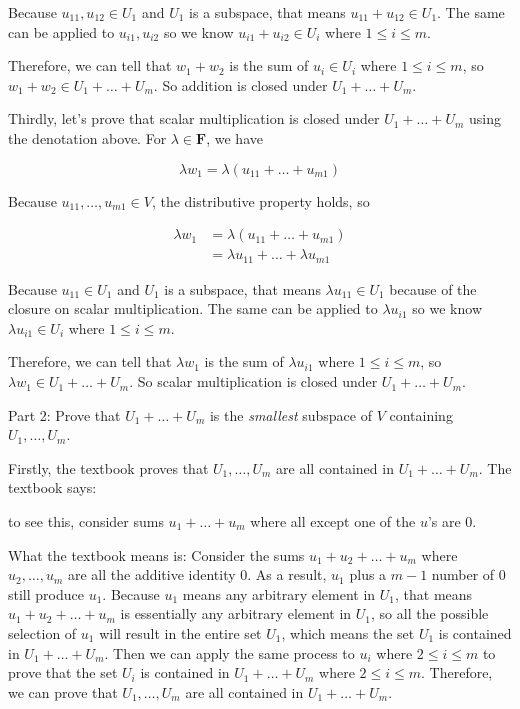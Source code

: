 \documentclass[12pt, letterpaper, oneside]{book}
\begin{document}
Because $u_{11}, u_{12} \in U_1$ and $U_1$ is a subspace, that means $u_{11} +
u_{12} \in U_1$. The same can be applied to $u_{i1}, u_{i2}$ so we know
$u_{i1} + u_{i2} \in U_i$ where $1 \leq i \leq m$.

Therefore, we can tell that $w_1 + w_2$ is the sum of $u_i \in U_i$ where
$1 \leq i \leq m$, so $w_1 + w_2 \in U_1 + \ldots + U_m$. So addition is closed
under $U_1 + \ldots + U_m$.

Thirdly, let's prove that scalar multiplication is closed under $U_1 + \ldots +
U_m$ using the denotation above. For $\lambda \in \mathbf{F}$, we have

\[
  \lambda w_1 = \lambda (u_{11} + \ldots + u_{m1})
\]

Because $u_{11}, \ldots, u_{m1} \in V$, the distributive property holds, so

\begin{align*}
  \lambda w_1 & = \lambda (u_{11} + \ldots + u_{m1}) \\
              & = \lambda u_{11} + \ldots + \lambda u_{m1}
\end{align*}

Because $u_{11} \in U_1$ and $U_1$ is a subspace, that means $\lambda u_{11}
\in U_1$ because of the closure on scalar multiplication. The same can be
applied to $\lambda u_{i1}$ so we know $\lambda u_{i1} \in U_i$ where $1 \leq i
\leq m$.

Therefore, we can tell that $\lambda w_1$ is the sum of $\lambda u_{i1}$ where
$1 \leq i \leq m$, so $\lambda w_1 \in U_1 + \ldots + U_m$. So scalar
multiplication is closed under $U_1 + \ldots + U_m$.

Part 2: Prove that $U_1 + \ldots + U_m$ is the \textit{smallest} subspace of
$V$ containing $U_1, \ldots, U_m$.

Firstly, the textbook proves that $U_1, \ldots, U_m$ are all contained in
$U_1 + \ldots + U_m$. The textbook says:

\begin{displayquote}
  to see this, consider sums $u_1 + \ldots + u_m$ where all except one of the
  $u$'s are 0.
\end{displayquote}

What the textbook means is: Consider the sums $u_1 + u_2 + \ldots + u_m$ where
$u_2, \ldots, u_m$ are all the additive identity $0$. As a result, $u_1$ plus a
$m-1$ number of $0$ still produce $u_1$. Because $u_1$ means any arbitrary
element in $U_1$, that means $u_1 + u_2 + \ldots + u_m$ is essentially any
arbitrary element in $U_1$, so all the possible selection of $u_1$ will result
in the entire set $U_1$, which means the set $U_1$ is contained in $U_1 +
\ldots + U_m$. Then we can apply the same process to $u_i$ where $2 \leq i \leq
m$ to prove that the set $U_i$ is contained in $U_1 + \ldots + U_m$ where $2
\leq i \leq m$. Therefore, we can prove that $U_1, \ldots, U_m$ are all
contained in $U_1 + \ldots + U_m$.
\end{document}
